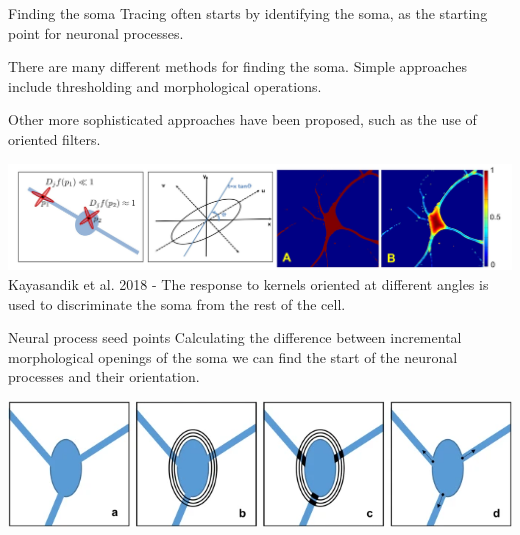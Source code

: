 \documentclass[9pt, aspectratio=169]{beamer}
\begin{document}
\begin{frame}
    {Finding the soma}
    Tracing often starts by identifying the soma, as the starting point for neuronal processes.

    There are many different methods for finding the soma. Simple approaches include thresholding and morphological operations.

    \pause

    Other more sophisticated approaches have been proposed, such as the use of oriented filters.

    \centering
    \includegraphics[width=\textwidth]{Kayasandik_2018_find_soma.jpg}
    \footnotesize
    Kayasandik et al. 2018 - The response to kernels oriented at different angles is used to discriminate the soma from the rest of the cell.
\end{frame}

\begin{frame}
{Neural process seed points}
Calculating the difference between incremental morphological openings of the soma we can find the start of the neuronal processes and their orientation.

\includegraphics[width=\textwidth]{Kayasandik_2018_find_process_start.png}
\end{frame}
\end{document}
